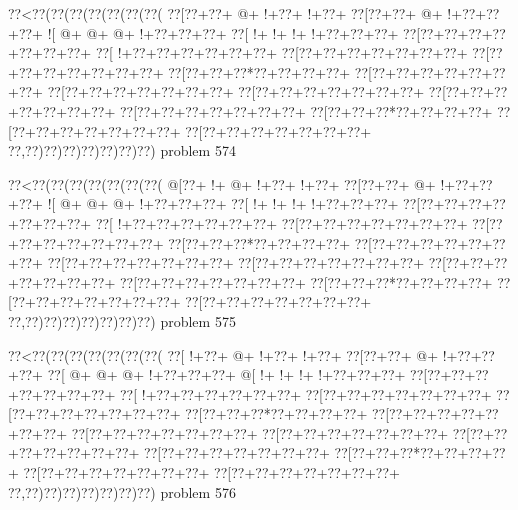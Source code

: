 \vbox{\vbox{\goo
\0??<\0??(\0??(\0??(\0??(\0??(\0??(\0??(
\0??[\0??+\0??+\- @+\- !+\0??+\- !+\0??+
\0??[\0??+\0??+\- @+\- !+\0??+\0??+\0??+
\- ![\- @+\- @+\- @+\- !+\0??+\0??+\0??+
\0??[\- !+\- !+\- !+\- !+\0??+\0??+\0??+
\0??[\0??+\0??+\0??+\0??+\0??+\0??+\0??+
\0??[\- !+\0??+\0??+\0??+\0??+\0??+\0??+
\0??[\0??+\0??+\0??+\0??+\0??+\0??+\0??+
\0??[\0??+\0??+\0??+\0??+\0??+\0??+\0??+
\0??[\0??+\0??+\0??*\0??+\0??+\0??+\0??+
\0??[\0??+\0??+\0??+\0??+\0??+\0??+\0??+
\0??[\0??+\0??+\0??+\0??+\0??+\0??+\0??+
\0??[\0??+\0??+\0??+\0??+\0??+\0??+\0??+
\0??[\0??+\0??+\0??+\0??+\0??+\0??+\0??+
\0??[\0??+\0??+\0??+\0??+\0??+\0??+\0??+
\0??[\0??+\0??+\0??*\0??+\0??+\0??+\0??+
\0??[\0??+\0??+\0??+\0??+\0??+\0??+\0??+
\0??[\0??+\0??+\0??+\0??+\0??+\0??+\0??+
\0??,\0??)\0??)\0??)\0??)\0??)\0??)\0??)
}
\hfil problem 574\hfil\break
}

\vbox{\vbox{\goo
\0??<\0??(\0??(\0??(\0??(\0??(\0??(\0??(
\- @[\0??+\- !+\- @+\- !+\0??+\- !+\0??+
\0??[\0??+\0??+\- @+\- !+\0??+\0??+\0??+
\- ![\- @+\- @+\- @+\- !+\0??+\0??+\0??+
\0??[\- !+\- !+\- !+\- !+\0??+\0??+\0??+
\0??[\0??+\0??+\0??+\0??+\0??+\0??+\0??+
\0??[\- !+\0??+\0??+\0??+\0??+\0??+\0??+
\0??[\0??+\0??+\0??+\0??+\0??+\0??+\0??+
\0??[\0??+\0??+\0??+\0??+\0??+\0??+\0??+
\0??[\0??+\0??+\0??*\0??+\0??+\0??+\0??+
\0??[\0??+\0??+\0??+\0??+\0??+\0??+\0??+
\0??[\0??+\0??+\0??+\0??+\0??+\0??+\0??+
\0??[\0??+\0??+\0??+\0??+\0??+\0??+\0??+
\0??[\0??+\0??+\0??+\0??+\0??+\0??+\0??+
\0??[\0??+\0??+\0??+\0??+\0??+\0??+\0??+
\0??[\0??+\0??+\0??*\0??+\0??+\0??+\0??+
\0??[\0??+\0??+\0??+\0??+\0??+\0??+\0??+
\0??[\0??+\0??+\0??+\0??+\0??+\0??+\0??+
\0??,\0??)\0??)\0??)\0??)\0??)\0??)\0??)
}
\hfil problem 575\hfil\break
}

\vbox{\vbox{\goo
\0??<\0??(\0??(\0??(\0??(\0??(\0??(\0??(
\0??[\- !+\0??+\- @+\- !+\0??+\- !+\0??+
\0??[\0??+\0??+\- @+\- !+\0??+\0??+\0??+
\0??[\- @+\- @+\- @+\- !+\0??+\0??+\0??+
\- @[\- !+\- !+\- !+\- !+\0??+\0??+\0??+
\0??[\0??+\0??+\0??+\0??+\0??+\0??+\0??+
\0??[\- !+\0??+\0??+\0??+\0??+\0??+\0??+
\0??[\0??+\0??+\0??+\0??+\0??+\0??+\0??+
\0??[\0??+\0??+\0??+\0??+\0??+\0??+\0??+
\0??[\0??+\0??+\0??*\0??+\0??+\0??+\0??+
\0??[\0??+\0??+\0??+\0??+\0??+\0??+\0??+
\0??[\0??+\0??+\0??+\0??+\0??+\0??+\0??+
\0??[\0??+\0??+\0??+\0??+\0??+\0??+\0??+
\0??[\0??+\0??+\0??+\0??+\0??+\0??+\0??+
\0??[\0??+\0??+\0??+\0??+\0??+\0??+\0??+
\0??[\0??+\0??+\0??*\0??+\0??+\0??+\0??+
\0??[\0??+\0??+\0??+\0??+\0??+\0??+\0??+
\0??[\0??+\0??+\0??+\0??+\0??+\0??+\0??+
\0??,\0??)\0??)\0??)\0??)\0??)\0??)\0??)
}
\hfil problem 576\hfil\break
}

